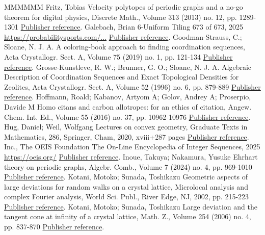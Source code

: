 \documentclass[11pt]{article}
\theoremstyle{definition}
\numberwithin{equation}{section}
\begin{document}
\begin{thebibliography}{MMMMMM}
 Fritz, Tobias Velocity polytopes of periodic graphs and a no-go theorem for digital physics, Discrete Math., Volume 313 (2013) no. 12, pp. 1289-1301 \href{https://alco.centre-mersenne.org/articles/10.5802/alco.445/#Fri13}{Publisher reference}.
 Galebach, Brian 6-Uniform Tiling 673 of 673, 2025 \url{https://probabilitysports.com/...} \href{https://alco.centre-mersenne.org/articles/10.5802/alco.445/#Gal}{Publisher reference}.
 Goodman-Strauss, C.; Sloane, N. J. A. A coloring-book approach to finding coordination sequences, Acta Crystallogr. Sect. A, Volume 75 (2019) no. 1, pp. 121-134 \href{https://alco.centre-mersenne.org/articles/10.5802/alco.445/#GS19}{Publisher reference}.
 Grosse-Kunstleve, R. W.; Brunner, G. O.; Sloane, N. J. A. Algebraic Description of Coordination Sequences and Exact Topological Densities for Zeolites, Acta Crystallogr. Sect. A, Volume 52 (1996) no. 6, pp. 879-889 \href{https://alco.centre-mersenne.org/articles/10.5802/alco.445/#GKBS96}{Publisher reference}.
 Hoffmann, Roald; Kabanov, Artyom A; Golov, Andrey A; Proserpio, Davide M Homo citans and carbon allotropes: for an ethics of citation, Angew. Chem. Int. Ed., Volume 55 (2016) no. 37, pp. 10962-10976 \href{https://alco.centre-mersenne.org/articles/10.5802/alco.445/#SACADA}{Publisher reference}.
 Hug, Daniel; Weil, Wolfgang Lectures on convex geometry, Graduate Texts in Mathematics, 286, Springer, Cham, 2020, xviii+287 pages \href{https://alco.centre-mersenne.org/articles/10.5802/alco.445/#HW}{Publisher reference}.
 Inc., The OEIS Foundation The On-Line Encyclopedia of Integer Sequences, 2025 \url{https://oeis.org/} \href{https://alco.centre-mersenne.org/articles/10.5802/alco.445/#OEIS}{Publisher reference}.
 Inoue, Takuya; Nakamura, Yusuke Ehrhart theory on periodic graphs, Algebr. Comb., Volume 7 (2024) no. 4, pp. 969-1010 \href{https://alco.centre-mersenne.org/articles/10.5802/alco.445/#IN}{Publisher reference}.
 Kotani, Motoko; Sunada, Toshikazu Geometric aspects of large deviations for random walks on a crystal lattice, Microlocal analysis and complex Fourier analysis, World Sci. Publ., River Edge, NJ, 2002, pp. 215-223 \href{https://alco.centre-mersenne.org/articles/10.5802/alco.445/#KS02}{Publisher reference}.
 Kotani, Motoko; Sunada, Toshikazu Large deviation and the tangent cone at infinity of a crystal lattice, Math. Z., Volume 254 (2006) no. 4, pp. 837-870 \href{https://alco.centre-mersenne.org/articles/10.5802/alco.445/#KS06}{Publisher reference}.

\end{thebibliography}
\end{document}
